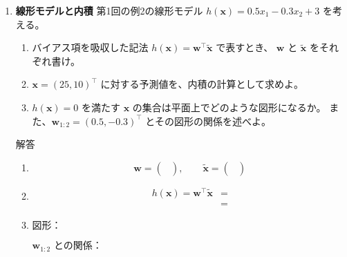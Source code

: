 \documentclass[a4paper,dvipdfmx]{jsarticle}
\newcommand{\学籍番号}{0000000}
\newcommand{\氏名}{氏名を書く}
\newcommand{\提出日}{2026年10月8日}
\newenvironment{answer}{\begin{itembox}[l]{解答}}{\end{itembox}}
\begin{document}
\begin{enumerate}
  \item \textbf{線形モデルと内積}\quad
    第1回の例2の線形モデル $h(\bm{x}) = 0.5 x_1 - 0.3 x_2 + 3$ を考える。
    \begin{enumerate}
      \item バイアス項を吸収した記法 $h(\bm{x}) = \bm{w}^\top \tilde{\bm{x}}$ で表すとき、
        $\bm{w}$ と $\tilde{\bm{x}}$ をそれぞれ書け。
      \item $\bm{x} = (25, 10)^\top$ に対する予測値を、内積の計算として求めよ。
      \item $h(\bm{x}) = 0$ を満たす $\bm{x}$ の集合は平面上でどのような図形になるか。
        また、$\bm{w}_{1:2} = (0.5, -0.3)^\top$ とその図形の関係を述べよ。
    \end{enumerate}
    \begin{answer}
      \begin{enumerate}
        \item
          \begin{equation*}
            \bm{w} = \begin{pmatrix} \\ \\ \end{pmatrix}, \qquad
            \tilde{\bm{x}} = \begin{pmatrix} \\ \\ \end{pmatrix}
          \end{equation*}
        \item
          \begin{align*}
            h(\bm{x}) = \bm{w}^\top \tilde{\bm{x}} &= \\
                                                   &=
          \end{align*}
        \item 図形：
          \begin{equation*}
            \phantom{XXXXXXXXXXXXXXXXXXXX}
          \end{equation*}
          $\bm{w}_{1:2}$ との関係：
      \end{enumerate}
    \end{answer}


\end{enumerate}
\end{document}
